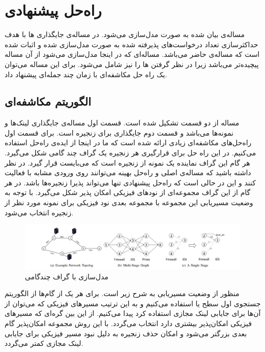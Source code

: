 
\chapter{راه‌حل پیشنهادی}

مساله‌ی بیان شده به صورت 
مدل‌سازی می‌شود.
در \cite{Eramo2016}
مساله‌ی جایگذاری ها با هدف حداکثرسازی تعداد درخواست‌های پذیرفته شده
به صورت  مدل‌سازی شده و اثبات شده است که مساله‌ی حاضر  می‌باشد.
مساله‌ای که در اینجا مدل‌سازی می‌شود از آن مساله پیچیده‌تر می‌باشد زیرا در نظر گرفتن ها را نیز شامل می‌شود.
برای این مساله می‌توان
یک راه حل مکاشفه‌ای با زمان چند جمله‌ای
پیشنهاد داد.

\section{الگوریتم مکاشفه‌ای}

مساله از دو قسمت تشکیل شده است. قسمت اول مساله‌ی جایگذاری لینک‌ها و نمونه‌ها می‌باشد
و قسمت دوم جایگذاری
برای زنجیره است.
برای قسمت اول راه‌حل‌های مکاشفه‌ای زیادی ارائه شده است که ما در اینجا
از ایده‌ی راه‌حل \cite{Bari2015} استفاده می‌کنیم.
در این راه حل برای قرارگیری هر زنجیره یک گراف چند گامی شکل می‌گیرد.
هر گام این گراف نماینده یک نمونه از زنجیره است که می‌بایست قرار گیرد.
در نظر داشته باشید که مساله‌ی اصلی و راه‌حل بهینه می‌توانند روی ورودی مشابه با 
فعالیت کنند و این در حالی است که راه‌حل پیشنهادی تنها می‌تواند پذیرا زنجیره‌ها باشد.
در هر گام از این گراف مجموعه‌ای از نودهای فیزیکی امکان پذیر شکل می‌گیرد.
با توجه به وضعیت مسیریابی این مجموعه با مجموعه بعدی نود فیزیکی برای نمونه مورد نظر از زنجیره انتخاب می‌شود.

\begin{figure}[h]
\center\includegraphics[scale=.45]{images/bari}
\caption{مدل‌سازی با گراف چندگامی \cite{Bari2015}}
\label{fig.5}
\end{figure}

منظور از وضعیت مسیریابی به شرح زیر است. برای هر یک از گام‌ها از الگوریتم جستجوی اول سطح یا
استفاده می‌کنیم
و به این ترتیب مسیرهای فیزیکی که می‌توان از آن‌ها برای جایابی لینک مجازی استفاده کرد پیدا می‌کنیم.
از این بین گره‌ای که مسیرهای فیزیکی امکان‌پذیر بیشتری دارد انتخاب می‌گردد.
با این روش مجموعه امکان‌پذیر گام بعدی بزرگتر می‌شود و امکان حذف زنجیره به دلیل نبود مسیر فیزیکی
برای جایابی لینک مجازی کمتر می‌گردد.

